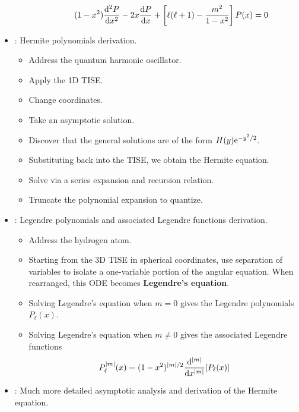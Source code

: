 \documentclass[../finalProject.tex]{subfiles}
\begin{document}
\begin{itemize}
\begin{itemize}
\begin{itemize}
            \begin{equation*}
                (1-x^2)\dv[2]{P}{x}-2x\dv{P}{x}+\left[ \ell(\ell+1)-\frac{m^2}{1-x^2} \right]P(x) = 0
            \end{equation*}
        \end{itemize}
    \end{itemize}
    \item \textcite[28-31]{bib:CHEM26100Notes}: Hermite polynomials derivation.
    \begin{itemize}
        \item Address the quantum harmonic oscillator.
        \item Apply the 1D TISE.
        \item Change coordinates.
        \item Take an asymptotic solution.
        \item Discover that the general solutions are of the form $H(y)\e[-y^2/2]$.
        \item Substituting back into the TISE, we obtain the Hermite equation.
        \item Solve via a series expansion and recursion relation.
        \item Truncate the polynomial expansion to quantize.
    \end{itemize}
    \item \textcite[56-65]{bib:CHEM26100Notes}: Legendre polynomials and associated Legendre functions derivation.
    \begin{itemize}
        \item Address the hydrogen atom.
        \item Starting from the 3D TISE in spherical coordinates, use separation of variables to isolate a one-variable portion of the angular equation. When rearranged, this ODE becomes \textbf{Legendre's equation}.
        \item Solving Legendre's equation when $m=0$ gives the Legendre polynomials $P_\ell(x)$.
        \item Solving Legendre's equation when $m\neq 0$ gives the associated Legendre functions
        \begin{equation*}
            P_\ell^{|m|}(x) = (1-x^2)^{|m|/2}\dv[|m|]{x}[P_\ell(x)]
        \end{equation*}
    \end{itemize}
    \item \textcite[34-37]{bib:PHYS23410Notes}: Much more detailed asymptotic analysis and derivation of the Hermite equation.

\end{itemize}
\end{document}
